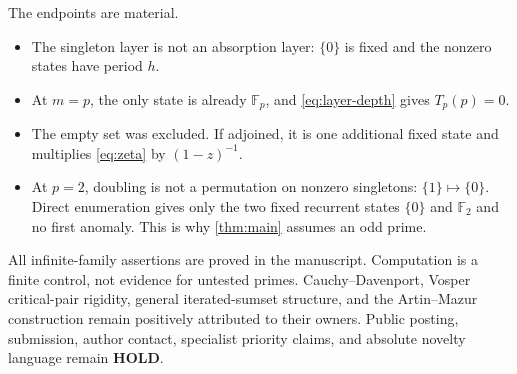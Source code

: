 \documentclass[11pt,a4paper]{amsart}
\theoremstyle{definition}
\theoremstyle{remark}
\newcommand{\Fp}{\mathbb F_p}
\begin{document}
The endpoints are material.
\begin{itemize}
\item The singleton layer is not an absorption layer: $\{0\}$ is fixed and
  the nonzero states have period $h$.
\item At $m=p$, the only state is already $\Fp$, and
  \eqref{eq:layer-depth} gives $T_p(p)=0$.
\item The empty set was excluded.  If adjoined, it is one additional fixed
  state and multiplies \eqref{eq:zeta} by $(1-z)^{-1}$.
\item At $p=2$, doubling is not a permutation on nonzero singletons:
  $\{1\}\mapsto\{0\}$.  Direct enumeration gives only the two fixed
  recurrent states $\{0\}$ and $\mathbb F_2$ and no first anomaly.  This is
  why \cref{thm:main} assumes an odd prime.
\end{itemize}

All infinite-family assertions are proved in the manuscript.  Computation
is a finite control, not evidence for untested primes.  Cauchy--Davenport,
Vosper critical-pair rigidity, general iterated-sumset structure, and the
Artin--Mazur construction remain positively attributed to their owners.
Public posting, submission, author contact, specialist priority claims, and
absolute novelty language remain \textbf{HOLD}.



\end{document}
